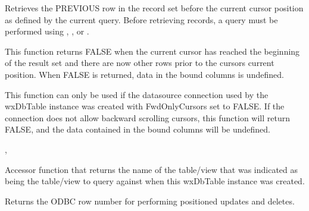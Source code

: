

\label{wxdbtablegetprev}


Retrieves the PREVIOUS row in the record set before the current cursor
position as defined by the current query.  Before retrieving records, a
query must be performed using ,
,
 or
.


This function returns FALSE when the current cursor has reached the beginning
of the result set and there are now other rows prior to the cursors current
position.  When FALSE is returned, data in the bound columns is undefined.


This function can only be used if the datasource connection used by the
wxDbTable instance was created with FwdOnlyCursors set to FALSE.  If the
connection does not allow backward scrolling cursors, this function will
return FALSE, and the data contained in the bound columns will be undefined.


,

\label{wxdbtablegetquerytablename}


Accessor function that returns the name of the table/view that was indicated
as being the table/view to query against when this wxDbTable instance was
created.



\label{wxdbtablegetrownum}


Returns the ODBC row number for performing positioned updates and deletes.


